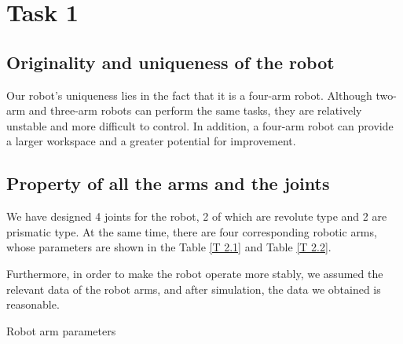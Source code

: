 \section{Task 1}
\FloatBarrier %


\subsection{Originality and uniqueness of the robot}

Our robot's uniqueness lies in the fact that it is a four-arm robot. Although two-arm and three-arm robots can perform the same tasks, they are relatively unstable and more difficult to control. In addition, a four-arm robot can provide a larger workspace and a greater potential for improvement.

\subsection{Property of all the arms and the joints}

We have designed 4 joints for the robot, 2 of which are revolute type and 2 are prismatic type. At the same time, there are four corresponding robotic arms, whose parameters are shown in the Table \ref{T 2.1} and Table \ref{T 2.2}.

Furthermore, in order to make the robot operate more stably, we assumed the relevant data of the robot arms, and after simulation, the data we obtained is reasonable.

\begin{minipage}[htbp]{\textwidth}
    \makeatletter{}
    \centering
    \caption{Robot arm parameters}
    \label{T 2.1} 
\end{minipage}



